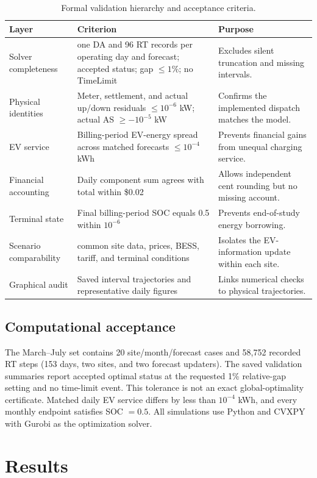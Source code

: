 \documentclass[final,5p,times]{elsarticle}
\begin{document}
\begin{table}[!t]
\centering
\caption{Formal validation hierarchy and acceptance criteria.}
\label{tab:validation_protocol}
\scriptsize
\begin{tabularx}{\textwidth}{@{}p{}p{}X@{}}
\toprule
Layer & Criterion & Purpose \\
\midrule
Solver completeness & one DA and 96 RT records per operating day and forecast; accepted status; gap $\le1\%$; no TimeLimit & Excludes silent truncation and missing intervals.\\
Physical identities & Meter, settlement, and actual up/down residuals $\le10^{-6}$ kW; actual AS $\ge-10^{-5}$ kW & Confirms the implemented dispatch matches the model.\\
EV service & Billing-period EV-energy spread across matched forecasts $\le10^{-4}$ kWh & Prevents financial gains from unequal charging service.\\
Financial accounting & Daily component sum agrees with total within \$0.02 & Allows independent cent rounding but no missing account.\\
Terminal state & Final billing-period SOC equals 0.5 within $10^{-6}$ & Prevents end-of-study energy borrowing.\\
Scenario comparability & common site data, prices, BESS, tariff, and terminal conditions & Isolates the EV-information update within each site.\\
Graphical audit & Saved interval trajectories and representative daily figures & Links numerical checks to physical trajectories.\\
\bottomrule
\end{tabularx}
\end{table}

\subsection{Computational acceptance}
The March--July set contains 20 site/month/forecast cases and 58,752 recorded
RT steps (153 days, two sites, and two forecast updaters). The saved validation
summaries report accepted optimal status at the requested 1\% relative-gap
setting and no time-limit event. This tolerance is not an exact global-optimality
certificate. Matched daily EV service differs by less than $10^{-4}$ kWh, and
every monthly endpoint satisfies SOC $=0.5$. All simulations use Python and
CVXPY with Gurobi as the optimization solver.

\section{Results}
\label{sec:results}
\end{document}
